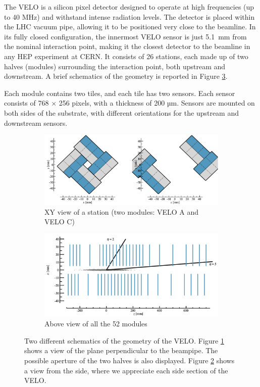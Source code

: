 The VELO is a silicon pixel detector designed to operate at high frequencies (up to 40 MHz) and withstand intense radiation levels. The detector is placed within the LHC vacuum pipe, allowing it to be positioned very close to the beamline. In its fully closed configuration, the innermost VELO sensor is just \SI{5.1}{\milli\meter} from the nominal interaction point, making it the closest detector to the beamline in any HEP experiment at CERN.
It consists of 26 stations, each made up of two halves (modules) surrounding the interaction point, both upstream and downstream. A brief schematics of the geometry is reported in Figure \ref{fig:velo-geometry}\cite{LHCbVelo:2019flq}.

Each module contains two tiles, and each tile has two sensors. Each sensor consists of 768 × 256 pixels, with a thickness of 200 µm. Sensors are mounted on both sides of the substrate, with different orientations for the upstream and downstream sensors. 

\begin{figure}
    \centering
    \begin{subfigure}{0.48\textwidth}
    \includegraphics[width=\linewidth]{figures/aperture.png}
    \caption{XY view of a station (two modules: VELO A and VELO C)}\label{fig_velo-xy}
    \end{subfigure}
    \begin{subfigure}{0.48\textwidth}
    \includegraphics[width=\linewidth]{figures/above_view.png}
    \caption{Above view of all the 52 modules}\label{fig_velo-side}
    \end{subfigure}
    \caption{Two different schematics of the geometry of the VELO. Figure \ref{fig_velo-xy} shows a view of the plane perpendicular to the beampipe. The possible aperture of the two halves is also displayed. Figure \ref{fig_velo-side} shows a view from the side, where we appreciate each side section of the VELO.}
    \label{fig:velo-geometry}
\end{figure}


